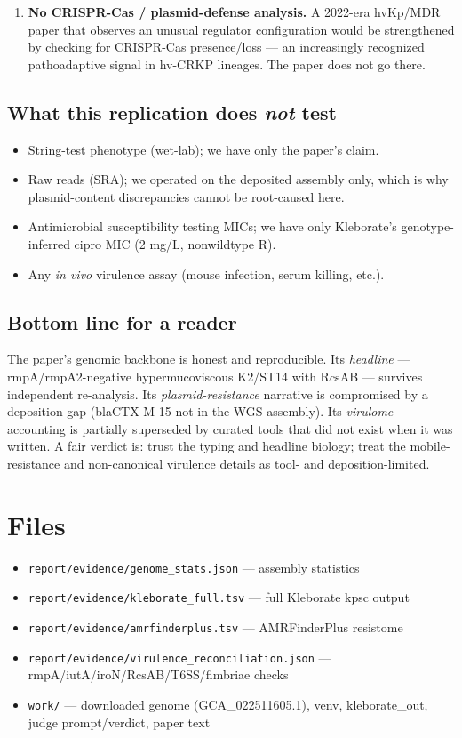 \documentclass[11pt]{article}
\begin{document}
\begin{enumerate}[leftmargin=*]
\item \textbf{No CRISPR-Cas / plasmid-defense analysis.} A 2022-era hvKp/MDR paper that observes an unusual regulator configuration would be strengthened by checking for CRISPR-Cas presence/loss --- an increasingly recognized pathoadaptive signal in hv-CRKP lineages. The paper does not go there.
\end{enumerate}

\subsection{What this replication does \emph{not} test}
\begin{itemize}[leftmargin=*]
\item String-test phenotype (wet-lab); we have only the paper's claim.
\item Raw reads (SRA); we operated on the deposited assembly only, which is why plasmid-content discrepancies cannot be root-caused here.
\item Antimicrobial susceptibility testing MICs; we have only Kleborate's genotype-inferred cipro MIC (2 mg/L, nonwildtype R).
\item Any \emph{in vivo} virulence assay (mouse infection, serum killing, etc.).
\end{itemize}

\subsection{Bottom line for a reader}
The paper's genomic backbone is honest and reproducible. Its \emph{headline} --- rmpA/rmpA2-negative hypermucoviscous K2/ST14 with RcsAB --- survives independent re-analysis. Its \emph{plasmid-resistance} narrative is compromised by a deposition gap (blaCTX-M-15 not in the WGS assembly). Its \emph{virulome} accounting is partially superseded by curated tools that did not exist when it was written. A fair verdict is: trust the typing and headline biology; treat the mobile-resistance and non-canonical virulence details as tool- and deposition-limited.

\section{Files}
\begin{itemize}[leftmargin=*]
\item \texttt{report/evidence/genome\_stats.json} --- assembly statistics
\item \texttt{report/evidence/kleborate\_full.tsv} --- full Kleborate kpsc output
\item \texttt{report/evidence/amrfinderplus.tsv} --- AMRFinderPlus resistome
\item \texttt{report/evidence/virulence\_reconciliation.json} --- rmpA/iutA/iroN/RcsAB/T6SS/fimbriae checks
\item \texttt{work/} --- downloaded genome (GCA\_022511605.1), venv, kleborate\_out, judge prompt/verdict, paper text
\end{itemize}
\end{document}
